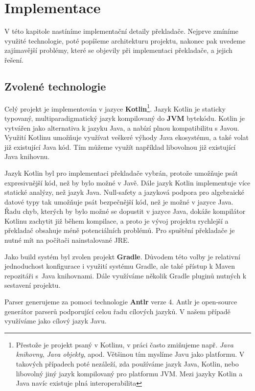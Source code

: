 \chapter{Implementace}

V této kapitole nastíníme implementační detaily překladače. Nejprve zmíníme využité technologie,
poté popíšeme architekturu projektu, nakonec pak uvedeme zajímavější problémy, které se objevily
při implementaci překladače, a jejich řešení.

\section{Zvolené technologie}

Celý projekt je implementován v jazyce \textbf{Kotlin}\cite{kotlin-src}\footnote{Přestože je projekt
  psaný v Kotlinu, v práci často zmiňujeme např. \textit{Java knihovny}, \textit{Java objekty},
  apod. Většinou tím myslíme Javu jako platformu. V takových případech poté nezáleží, zda
  používáme jazyk Java, Kotlin, nebo libovolný jiný jazyk kompilovaný pro platformu JVM.
  Mezi jazyky Kotlin a Java navíc existuje plná interoperabilita}.
Jazyk Kotlin je staticky typovaný, multiparadigmatický jazyk kompilovaný do \textbf{JVM} bytekódu.
Kotlin je vytvářen jako alternativa k jazyku Java, a nabízí plnou kompatibilitu s Javou. Využití
Kotlinu umožňuje využívat veškeré výhody Java ekosystému, a také volat již existující Java kód.
Tím můžeme využít například libovolnou již existující Java knihovnu.

Jazyk Kotlin byl pro implementaci překladače vybrán, protože umožňuje psát expresivnější kód, než by
bylo možné v Javě. Dále jazyk Kotlin implementuje více statické analýzy, než jazyk Java. Null-safety
a jazyková podpora pro algebraické datové typy tak umožňuje psát bezpečnější kód, než je možné
v jazyce Java. Řadu chyb, kterých by bylo možné se dopustit v jazyce Java, dokáže kompilátor Kotlinu
zachytit již během kompilace, a proto je vývoj projektu rychlejší a překladač obsahuje méně
potenciálních problémů. Pro spuštění překladače je nutné mít na počítači nainstalované JRE.

Jako build systém byl zvolen projekt \textbf{Gradle}\cite{gradle-src}. Důvodem této volby je
relativní jednoduchost konfigurace i využití systému Gradle, ale také přístup k Maven repozitáři
s~Java knihovnami. Dále využíváme několik Gradle pluginů nutných k sestavení projektu.

Parser generujeme za pomoci technologie \textbf{Antlr} verze 4. Antlr\cite{antlr-src} je open-source
generátor parserů podporující celou řadu cílových jazyků. V našem případě využíváme jako cílový
jazyk Javu.

